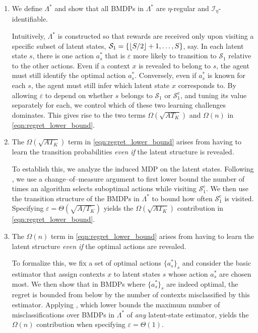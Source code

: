 \documentclass[11pt]{article}
\newcommand{\mcI}{\mathcal{I}}
\newcommand{\mcS}{\mathcal{S}}
\DeclarePairedDelimiter\floor{\lfloor}{\rfloor}
\theoremstyle{definition}
\theoremstyle{definition}
\begin{document}
\begin{enumerate}
	\item[Part 1.]
	      We define $\Lambda^*$ and show that all \glspl{BMDP} in $\Lambda^*$ are $\eta$-regular and $\mcI_{\eta}$-identifiable.

	      Intuitively, $\Lambda^*$ is constructed so that rewards are received only upon visiting a specific subset of latent states, $\mcS_1 = \{ \floor{S/2}+1,\ldots,S \}$, say.
	      In each latent state $s$, there is one action $a_s^*$ that is $\varepsilon$ more likely to transition to $\mcS_1$ relative to the other actions.
	      Even if a context $x$ is revealed to belong to $s$, the agent must still identify the optimal action $a_s^*$.
	      Conversely, even if $a_s^*$ is known for each $s$, the agent must still infer which latent state $x$ corresponds to.
	      By allowing $\varepsilon$ to depend on whether $s$ belongs to $\mcS_1$ or $\mcS_1^{\mathrm{c}}$, and tuning its value separately for each, we control which of these two learning challenges dominates.
	      This gives rise to the two terms $\Omega(\sqrt{AT_K})$ and $\Omega(n)$ in \eqref{eqn:regret_lower_bound}.

	\item[Part 2.]
	      The $\Omega(\sqrt{AT_K})$ term in \eqref{eqn:regret_lower_bound} arises from having to learn the transition probabilities \emph{even if} the latent structure is revealed.

	      To establish this, we analyze the induced \gls{MDP} on the latent states.
	      Following \cite{domingues2021episodic, doi:10.1287/moor.2017.0928}, we use a change--of--measure argument to first lower bound the number of times an algorithm selects suboptimal actions while visiting $\mcS_1^{\mathrm{c}}$.
	      We then use the transition structure of the \glspl{BMDP} in $\Lambda^*$ to bound how often $\mcS_1^{\mathrm{c}}$ is visited.
	      Specifying $\varepsilon = \Theta(\sqrt{A/T_K})$ yields the $\Omega(\sqrt{AT_K})$ contribution in \eqref{eqn:regret_lower_bound}.

	\item[Part 3.]
	      The $\Omega(n)$ term in \eqref{eqn:regret_lower_bound} arises from having to learn the latent structure \emph{even if} the optimal actions are revealed.

	      To formalize this, we fix a set of optimal actions $\{a_s^*\}_{s}$ and consider the basic estimator that assign contexts $x$ to latent states $s$ whose action $a_s^*$ are chosen most.
	      We then show that in \glspl{BMDP} where $\{a_s^*\}_{s}$ are indeed optimal, the regret is bounded from below by the number of contexts misclassified by this estimator.
	      Applying , which lower bounds the maximum number of misclassifications over \glspl{BMDP} in $\Lambda^*$ of \emph{any} latent-state estimator, yields the $\Omega(n)$ contribution when specifying $\varepsilon = \Theta(1)$.
\end{enumerate}
\end{document}

